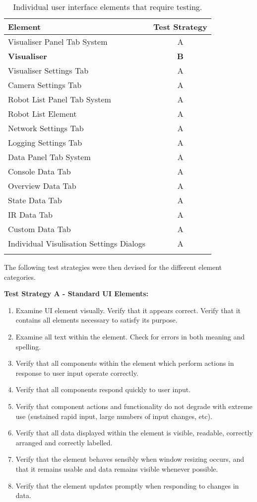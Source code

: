 \begin{longtable}{ l c }
\caption[User Interface Elements]{Individual user interface elements that require testing.}\\
 Element & Test Strategy\\
 \hline
 Visualiser Panel Tab System & A \\
 \textbf{Visualiser} & \textbf{B} \\
 Visualiser Settings Tab & A \\
 Camera Settings Tab & A \\
 Robot List Panel Tab System & A \\
 Robot List Element & A \\
 Network Settings Tab & A \\
 Logging Settings Tab & A \\
 Data Panel Tab System & A \\
 Console Data Tab & A \\
 Overview Data Tab & A \\
 State Data Tab & A \\
 IR Data Tab & A \\
 Custom Data Tab & A \\
 Individual Visulisation Settings Dialogs & A \\
 \bottomrule
 \label{tab:UserInterfaceElements}
\end{longtable}

The following test strategies were then devised for the different element categories.

\textbf{Test Strategy A - Standard UI Elements:}

\begin{enumerate}
 \item Examine UI element visually. Verify that it appears correct. Verify that it contains all elements necessary to satisfy its purpose.
 \item Examine all text within the element. Check for errors in both meaning and spelling.
 \item Verify that all components within the element which perform actions in response to user input operate correctly.
 \item Verify that all components respond quickly to user input.
 \item Verify that component actions and functionality do not degrade with extreme use (sustained rapid input, large numbers of input changes, etc).
 \item Verify that all data displayed within the element is visible, readable, correctly arranged and correctly labelled.
 \item Verify that the element behaves sensibly when window resizing occurs, and that it remains usable and data remains visible whenever possible.
 \item Verify that the element updates promptly when responding to changes in data.
\end{enumerate}

